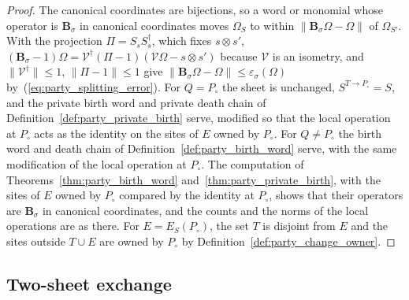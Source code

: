 \begin{proof}\leanok
    The canonical coordinates are bijections, so a word or monomial whose operator is
    $\mathbf B_\sigma$ in canonical coordinates moves $\Omega_S$ to within
    $\lVert\mathbf B_\sigma\Omega-\Omega\rVert$ of $\Omega_{S'}$. With the projection
    $\Pi=S_sS_s^\dagger$, which fixes $s\otimes s'$,
    $(\mathbf B_\sigma-1)\Omega=\mathcal V^\dagger(\Pi-1)(\mathcal V\Omega-s\otimes s')$ because
    $\mathcal V$ is an isometry, and $\lVert\mathcal V^\dagger\rVert\leq1$,
    $\lVert\Pi-1\rVert\leq1$ give
    $\lVert\mathbf B_\sigma\Omega-\Omega\rVert\leq\varepsilon_\sigma(\Omega)$
    by~(\ref{eq:party_splitting_error}). For $Q=P_\circ$ the sheet is unchanged,
    $S^{T\to P_\circ}=S$, and the private birth word and private death chain of
    Definition~\ref{def:party_private_birth} serve, modified so that the local operation at
    $P_\circ$ acts as the identity on the sites of $E$ owned by $P_\circ$. For $Q\neq P_\circ$ the
    birth word and death chain of Definition~\ref{def:party_birth_word} serve, with the same
    modification of the local operation at $P_\circ$. The computation of
    Theorems~\ref{thm:party_birth_word} and~\ref{thm:party_private_birth}, with the sites of
    $E$ owned by $P_\circ$ compared by the identity at $P_\circ$, shows that their operators are
    $\mathbf B_\sigma$ in canonical coordinates, and the counts and the norms of the local
    operations are as there. For $E=E_S(P_\circ)$, the set $T$ is disjoint from $E$ and the sites outside
    $T\cup E$ are owned by $P_\circ$ by Definition~\ref{def:party_change_owner}.
\end{proof}

\subsection{Two-sheet exchange}

